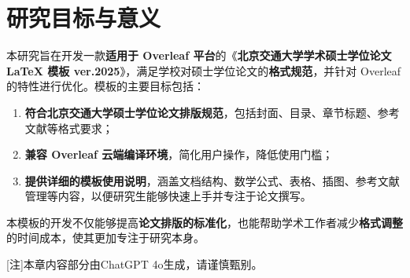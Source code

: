 \section{研究目标与意义}
本研究旨在开发一款\textbf{适用于 Overleaf 平台}的《\textbf{北京交通大学学术硕士学位论文 \LaTeX{} 模板 ver.2025}》，满足学校对硕士学位论文的\textbf{格式规范}，并针对 Overleaf 的特性进行优化。模板的主要目标包括：
\begin{enumerate}[itemsep=0pt,topsep=2pt,parsep=0pt]
    \item \textbf{符合北京交通大学硕士学位论文排版规范}，包括封面、目录、章节标题、参考文献等格式要求；
    \item \textbf{兼容 Overleaf 云端编译环境}，简化用户操作，降低使用门槛；
    \item \textbf{提供详细的模板使用说明}，涵盖文档结构、数学公式、表格、插图、参考文献管理等内容，以便研究生能够快速上手并专注于论文撰写。
\end{enumerate}

本模板的开发不仅能够提高\textbf{论文排版的标准化}，也能帮助学术工作者减少\textbf{格式调整}的时间成本，使其更加专注于研究本身。

[注]\quad 本章内容部分由ChatGPT 4o生成，请谨慎甄别。



